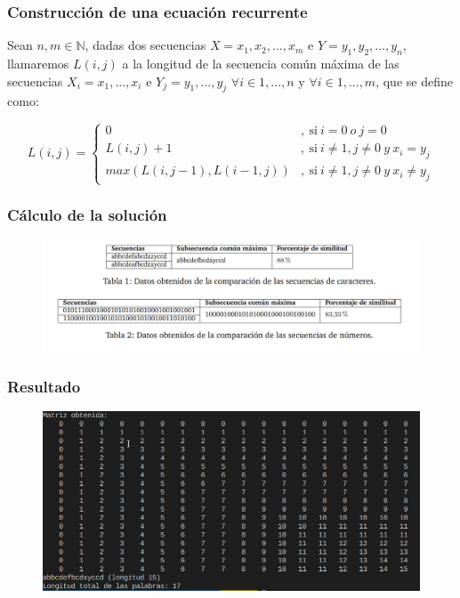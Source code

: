 \documentclass[13pt]{beamer}
\begin{document}
    \begin{frame}
		\frametitle{Construcción de una ecuación recurrente}
        Sean $n,m \in \mathbb{N}$, dadas dos secuencias $X = { x_1,x_2,...,x_m}$ e $Y = { y_1,y_2,...,y_n}$, llamaremos $L(i,j)$ a la 
        longitud de la secuencia común máxima de las secuencias $X_i = {x_1,...,x_i}$ e $Y_j = {y_1,...,y_j}$ $\forall i \in {1,...,n} $ y $\forall i \in {1,...,m}$, 
        que se define como:  

        \[
        L(i,j) = 
        \left \{
            \begin{aligned}
            0 &,\ \text{si} \ i = 0 \ o \ j = 0\\
            L(i,j) + 1 &,\ \text{si} \ i \neq  1 , j \neq  0 \ y \ x_i = y_j\\
            max(L(i,j-1) , L(i-1,j))&,\ \text{si} \ i \neq 1 , j \neq 0 \ y \ x_i \neq y_j
            \end{aligned}
        \right .
        \]
	\end{frame}



    \begin{frame}
		\frametitle{Cálculo de la solución}
        \begin{figure}
            \centering
            \includegraphics[scale=0.35]{table.png}
          \end{figure}
	\end{frame}


    \begin{frame}
		\frametitle{Resultado}
        \begin{figure}
            \centering
            \includegraphics[scale=0.55]{LettersMatrixResult.png}
          \end{figure}
	\end{frame}
	
\end{document}

